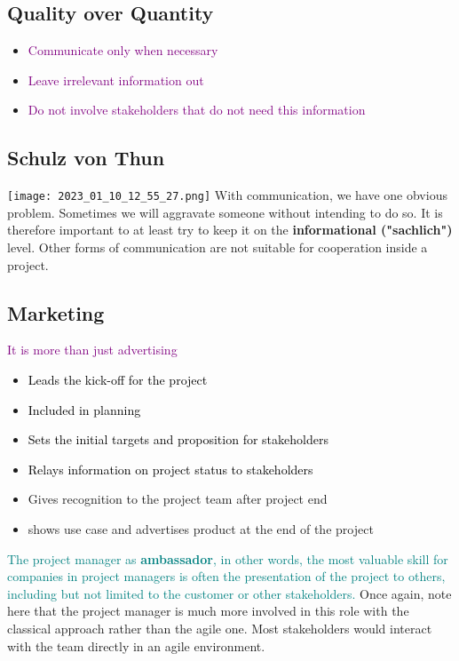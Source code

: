 \documentclass[main.tex,fontsize=12pt,paper=a4,paper=landscape,DIV=calc,]{scrartcl}
\begin{document}
\begin{multicols*}{2}
\subsection{Quality over Quantity}
\begin{itemize}
\item \textcolor{purple}{Communicate only when necessary}
\item \textcolor{purple}{Leave irrelevant information out}
\item \textcolor{purple}{Do not involve stakeholders that do not need this information}
\end{itemize}

\subsection{Schulz von Thun}
\texttt{[image: 2023\_01\_10\_12\_55\_27.png]}\newline
With communication, we have one obvious problem. Sometimes we will aggravate someone without intending to do so.\newline
It is therefore important to at least try to keep it on the \textbf{informational ("sachlich")} level.\newline
Other forms of communication are not suitable for cooperation inside a project. 

\subsection{Marketing}
\textcolor{purple}{It is more than just advertising}\newline
\begin{itemize}
\item \textcolor{black}{Leads the kick-off for the project}
\item \textcolor{black}{Included in planning}
\item \textcolor{black}{Sets the initial targets and proposition for stakeholders}
\item \textcolor{black}{Relays information on project status to stakeholders}
\item Gives recognition to the project team after project end 
\item shows use case and advertises product at the end of the project
\end{itemize} 
\textcolor{teal}{The project manager as \textbf{ambassador}, in other words, the most valuable skill for companies in project managers is often the presentation of the project to others, including but not limited to the customer or other stakeholders.}\newline
Once again, note here that the project manager is much more involved in this role with the classical approach rather than the agile one.\newline
Most stakeholders would interact with the team directly in an agile environment. 


\end{multicols*}
\end{document}
